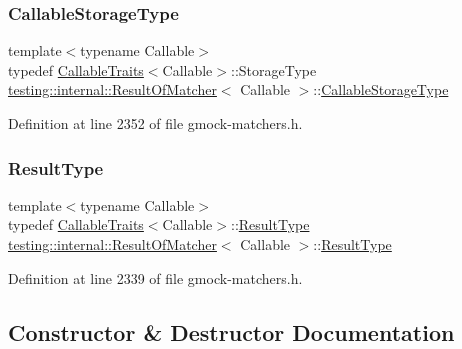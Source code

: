 \subsubsection{\texorpdfstring{Callable\+Storage\+Type}{CallableStorageType}}
{\footnotesize\ttfamily template$<$typename Callable$>$ \\
typedef \hyperlink{structtesting_1_1internal_1_1CallableTraits}{Callable\+Traits}$<$Callable$>$\+::Storage\+Type \hyperlink{classtesting_1_1internal_1_1ResultOfMatcher}{testing\+::internal\+::\+Result\+Of\+Matcher}$<$ Callable $>$\+::\hyperlink{classtesting_1_1internal_1_1ResultOfMatcher_a6f7f7d80162bebdf73681d6a3aa92c7d}{Callable\+Storage\+Type}\hspace{0.3cm}{\ttfamily [private]}}



Definition at line 2352 of file gmock-\/matchers.\+h.

\mbox{\label{classtesting_1_1internal_1_1ResultOfMatcher_aa9db2267792fcae2cfa3f57683f4e048}} 
\subsubsection{\texorpdfstring{Result\+Type}{ResultType}}
{\footnotesize\ttfamily template$<$typename Callable$>$ \\
typedef \hyperlink{structtesting_1_1internal_1_1CallableTraits}{Callable\+Traits}$<$Callable$>$\+::\hyperlink{classtesting_1_1internal_1_1ResultOfMatcher_aa9db2267792fcae2cfa3f57683f4e048}{Result\+Type} \hyperlink{classtesting_1_1internal_1_1ResultOfMatcher}{testing\+::internal\+::\+Result\+Of\+Matcher}$<$ Callable $>$\+::\hyperlink{classtesting_1_1internal_1_1ResultOfMatcher_aa9db2267792fcae2cfa3f57683f4e048}{Result\+Type}}



Definition at line 2339 of file gmock-\/matchers.\+h.



\subsection{Constructor \& Destructor Documentation}
\mbox{\label{classtesting_1_1internal_1_1ResultOfMatcher_a77c27bcc81ff133c1117a7edf84df0b9}} 
